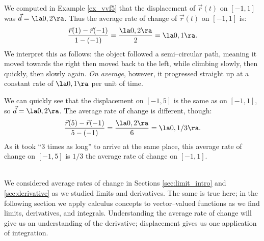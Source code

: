 {We computed in Example \ref{ex_vvf5} that the displacement of $\vec r(t)$ on $[-1,1]$ was $\vec d = \la 0,2\ra$. Thus the average rate of change of $\vec r(t)$ on $[-1,1]$ is:
$$\frac{\vec r(1) -\vec r(-1)}{1-(-1)} = \frac{\la 0,2\ra}{2} = \la 0,1\ra.$$
We interpret this as follows: the object followed a semi--circular path, meaning it moved towards the right then moved back to the left, while climbing slowly, then quickly, then slowly again. \emph{On average}, however, it progressed straight up at a constant rate of $\la 0,1\ra$ per unit of time.

We can quickly see that the displacement on $[-1,5]$ is the same as on $[-1,1]$, so $\vec d = \la 0,2\ra$. The average rate of change is different, though:
$$\frac{\vec r(5)-\vec r(-1)}{5-(-1)} = \frac{\la 0,2\ra}{6} = \la 0,1/3\ra.$$
As it took ``3 times as long'' to arrive at the same place, this average rate of change on $[-1,5]$ is $1/3$ the average rate of change on $[-1,1]$.
}\\

We considered average rates of change in Sections \ref{sec:limit_intro} and \ref{sec:derivative} as we studied limits and derivatives. The same is true here; in the following section we apply calculus concepts to vector--valued functions as we find limits, derivatives, and integrals. Understanding the average rate of change will give us an understanding of the derivative; displacement gives us one application of integration.

